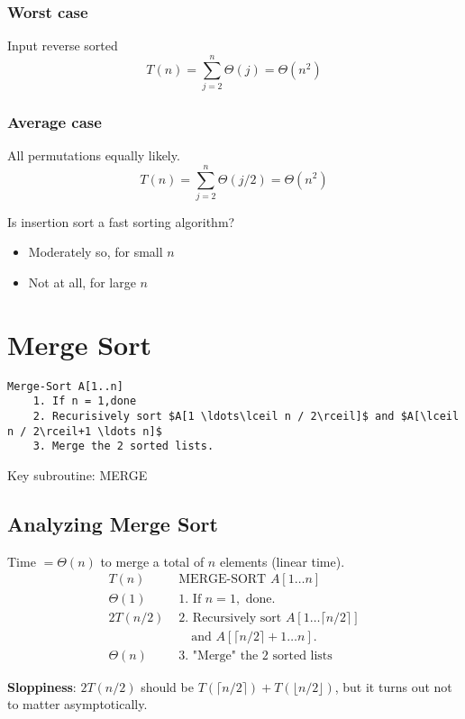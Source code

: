 \documentclass[11pt,toc=twocol]{elegantbook}
\begin{document}
\subsubsection*{Worst case}
Input reverse sorted
$$
T(n)=\sum_{j=2}^{n} \Theta(j)=\Theta\left(n^{2}\right)
$$
\subsubsection*{Average case}
All permutations equally likely.
$$
T(n)=\sum_{j=2}^{n} \Theta(j / 2)=\Theta\left(n^{2}\right)
$$

\begin{note}
  Is insertion sort a fast sorting algorithm?
  \begin{itemize}
    \item Moderately so, for small $n$
    \item Not at all, for large $n$
  \end{itemize}
\end{note}

\section{Merge Sort}

\begin{lstlisting}[mathescape=true]
  Merge-Sort A[1..n]
    1. If n = 1,done
    2. Recurisively sort $A[1 \ldots\lceil n / 2\rceil]$ and $A[\lceil n / 2\rceil+1 \ldots n]$
    3. Merge the 2 sorted lists.
\end{lstlisting}
\begin{note}
  Key subroutine: MERGE
\end{note}  
\subsection{Analyzing Merge Sort}
Time $=\Theta(n)$ to merge a total of $n$ elements (linear time).
$$
\begin{array}{l|l}
T(n) & \text { MERGE-SORT } A[1 \ldots n] \\
\Theta(1) & \text { 1. If } n=1, \text { done. } \\
2 T(n / 2) & \text { 2. Recursively sort } A[1 \ldots\lceil n / 2\rceil] \\
& \quad \text { and } A[\lceil n / 2\rceil+1 \ldots n] . \\
\Theta(n) & \text { 3. "Merge" the } 2 \text { sorted lists }
\end{array}
$$
\begin{note}
  \textbf{Sloppiness}: $2T(n/2)$ should be $T(\lceil n / 2\rceil)+T(\lfloor n / 2\rfloor)$, but it turns out not to matter asymptotically.
\end{note}
\end{document}
